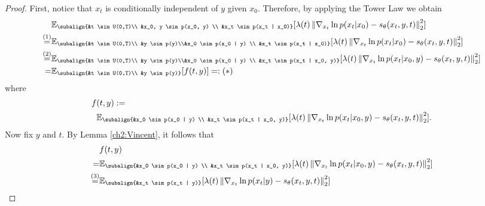 \begin{proof}
    First, notice that $x_t$ is conditionally independent of $y$ given $x_0$. Therefore, by applying the Tower Law we obtain
    \begin{align*}
        &\mathbb{E}_{\subalign{&t \sim U(0,T)\\ &x_0, y \sim p(x_0, y) \\ &x_t \sim p(x_t | x_0)}} 
            [\lambda(t) \norm{\nabla_{x_t} \ln{p(x_t | x_0)} - s_\theta(x_t, y, t)}_2^2] \\
            \overset{(1)}{=}& \mathbb{E}_{\subalign{&t \sim U(0,T)\\ &y \sim p(y)\\&x_0 \sim p(x_0 | y) \\ &x_t \sim p(x_t | x_0)}} 
            [\lambda(t) \norm{\nabla_{x_t} \ln{p(x_t | x_0)} - s_\theta(x_t, y, t)}_2^2] \\
            \overset{(2)}{=}& \mathbb{E}_{\subalign{&t \sim U(0,T)\\ &y \sim p(y)\\&x_0 \sim p(x_0 | y) \\ &x_t \sim p(x_t | x_0, y)}} 
            [\lambda(t) \norm{\nabla_{x_t} \ln{p(x_t | x_0, y)} - s_\theta(x_t, y, t)}_2^2] \\ 
            =& \mathbb{E}_{\subalign{&t \sim U(0,T)\\ &y \sim p(y)}} 
            [f(t,y)] =: (*)
    \end{align*}
    where 
    \begin{align*}
        f&(t,y) := \\
        &\mathbb{E}_{\subalign{&x_0 \sim p(x_0 | y) \\ &x_t \sim p(x_t | x_0, y)}} [
        \lambda(t) \norm{\nabla_{x_t} \ln{p(x_t | x_0, y)} - s_\theta(x_t, y, t)}_2^2
    ].
    \end{align*}
    Now fix $y$ and $t$. By Lemma \ref{ch2:Vincent}, it follows that
    \begin{align*}
        &f(t,y) \\
        =&\mathbb{E}_{\subalign{&x_0 \sim p(x_0 | y) \\ &x_t \sim p(x_t | x_0, y)}} 
            [\lambda(t) \norm{\nabla_{x_t} \ln{p(x_t | x_0, y)} - s_\theta(x_t, y, t)}_2^2]\\
        \overset{(3)}{=}& \mathbb{E}_{\subalign{&x_t \sim p(x_t |  y)}} 
            [\lambda(t) \norm{\nabla_{x_t} \ln{p(x_t | y)} - s_\theta(x_t, y, t)}_2^2]\\
    \end{align*}

\end{proof}
